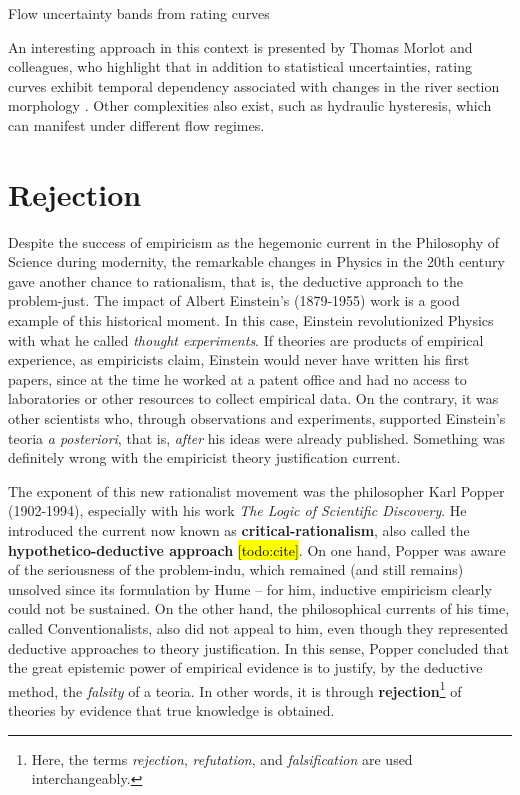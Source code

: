 \documentclass[./main_en.tex]{subfiles}
\begin{document}
\begin{simplebox}[
    float=htb,
    label={destaque_curvas_chave},
    nameref={Rating Curves}
    ]{Flow uncertainty bands from rating curves}
\begin{minipage}[t]{\linewidth}
    \par An interesting approach in this context is presented by Thomas Morlot and colleagues, who highlight that in addition to statistical uncertainties, rating curves exhibit temporal dependency associated with changes in the river section morphology \cite{Morlot2014}. Other complexities also exist, such as hydraulic hysteresis, which can manifest under different flow regimes.
    \end{minipage}
\label{box:rating-curve}
\normalsize
\end{simplebox}


\section{Rejection} \label{sec:epis:popper}

\par Despite the success of \gls{empiricism} as the hegemonic current in the Philosophy of Science during modernity, the remarkable changes in Physics in the 20th century gave another chance to \gls{rationalism}, that is, the deductive approach to the \gls{problem-just}. The impact of Albert Einstein's (1879-1955) work is a good example of this historical moment. In this case, Einstein revolutionized Physics with what he called \textit{thought experiments}. If theories are products of empirical experience, as empiricists claim, Einstein would never have written his first papers, since at the time he worked at a patent office and had no access to laboratories or other resources to collect empirical data. On the contrary, it was other scientists who, through observations and experiments, supported Einstein's \gls{teoria} \textit{a posteriori}, that is, \textit{after} his ideas were already published. Something was definitely wrong with the empiricist theory justification current.

\par The exponent of this new rationalist movement was the philosopher Karl Popper (1902-1994), especially with his work \textit{The Logic of Scientific Discovery}. He introduced the current now known as \textbf{\gls{critical-rationalism}}, also called the \textbf{hypothetico-deductive approach} \hl{[todo:cite]}. On one hand, Popper was aware of the seriousness of the \gls{problem-indu}, which remained (and still remains) unsolved since its formulation by Hume – for him, inductive \gls{empiricism} clearly could not be sustained. On the other hand, the philosophical currents of his time, called Conventionalists, also did not appeal to him, even though they represented deductive approaches to theory justification. In this sense, Popper concluded that the great epistemic power of empirical evidence is to justify, by the deductive method, the \textit{falsity} of a \gls{teoria}. In other words, it is through \textbf{rejection}\footnote{Here, the terms \textit{rejection}, \textit{refutation}, and \textit{falsification} are used interchangeably.} of theories by evidence that true knowledge is obtained.
\end{document}
